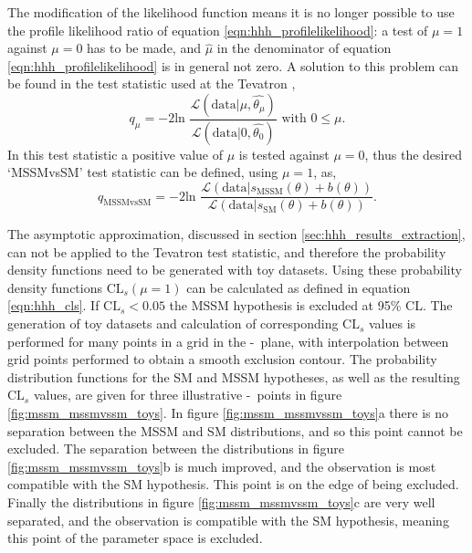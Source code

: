 The modification of the likelihood function means it is no longer possible
to use the profile likelihood ratio of equation \ref{eqn:hhh_profilelikelihood}:
a test of $\mu=1$ against $\mu=0$ has to be made, and 
$\hat{\mu}$ in the denominator of equation \ref{eqn:hhh_profilelikelihood} is in 
general not zero. A solution to this problem can be found in the test statistic used at the Tevatron \cite{LHCHComb2011},
\begin{equation}\label{eqn:mssm_tevatron_teststat}
q_{\mu} = -2\text{ln }\frac{\mathcal{L}(\text{data}|\mu,\hat{\theta_{\mu}})}{\mathcal{L}(\text{data}|0,\hat{\theta_0})} \text{ with } 0\leq\mu.
\end{equation}
In this test statistic a positive value of $\mu$ is tested against $\mu=0$, thus 
the desired `MSSMvsSM' test statistic can be defined, using $\mu=1$, as,
\begin{equation}\label{eqn:mssm_mssmvssm_stat}
q_{\text{MSSMvsSM}} = -2\text{ln }\frac{\mathcal{L}(\text{data}|s_{\text{MSSM}}(\theta) + b(\theta))}{\mathcal{L}(\text{data}|s_{\text{SM}}(\theta)+b(\theta))}.
\end{equation}

The asymptotic approximation, discussed in section \ref{sec:hhh_results_extraction}, can not be applied
to the Tevatron test statistic, and therefore the probability density functions need to be generated 
with toy datasets. Using these probability density functions $\text{CL}_s(\mu=1)$ can be calculated as defined in equation \ref{eqn:hhh_cls}.
If $\text{CL}_s < 0.05$ the MSSM hypothesis is excluded at 95\% CL. The generation of toy datasets and 
calculation of corresponding $\text{CL}_s$ values is performed for many points in a grid in the \mA-\tanb~plane,
with interpolation between grid points performed to obtain a smooth exclusion contour.
The probability distribution functions for the \ac{SM} and \ac{MSSM} hypotheses, as well as the resulting $\text{CL}_s$ values,
are given for three illustrative \mA-\tanb~points in figure \ref{fig:mssm_mssmvssm_toys}. In figure \ref{fig:mssm_mssmvssm_toys}a
there is no separation between the \ac{MSSM} and \ac{SM} distributions, and so this point cannot be excluded. The separation
between the distributions in figure \ref{fig:mssm_mssmvssm_toys}b is much improved, and the observation is most compatible
with the \ac{SM} hypothesis. This point is on the edge of being excluded. Finally the distributions in figure \ref{fig:mssm_mssmvssm_toys}c
are very well separated, and the observation is compatible with the \ac{SM} hypothesis, meaning this point of the parameter space is excluded.

